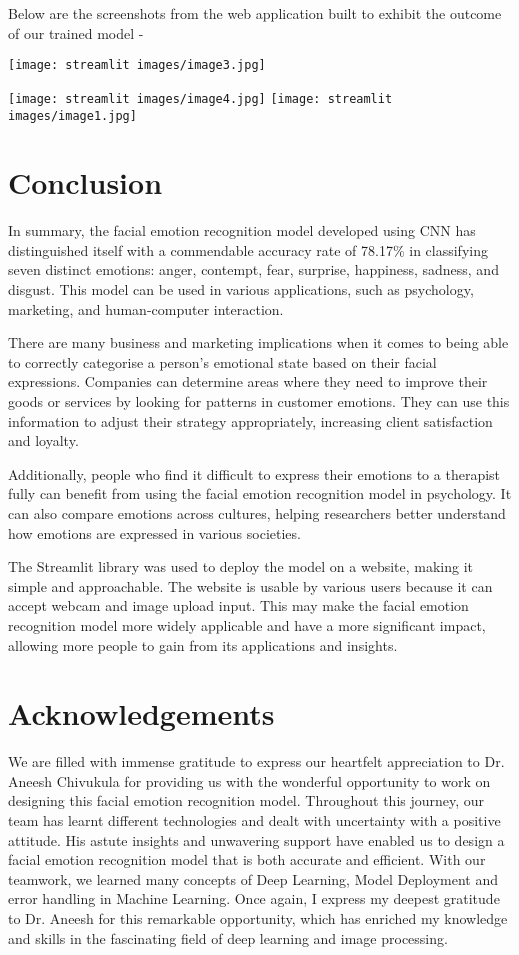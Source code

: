 \documentclass[11pt]{article}
\begin{document}
\noindent Below are the screenshots from the web application built to exhibit the outcome of our trained model -  
\begin{center}
    \texttt{[image: streamlit images/image3.jpg]}
\end{center}
\vspace{0.1in}
\begin{center}
    \texttt{[image: streamlit images/image4.jpg]}
    \texttt{[image: streamlit images/image1.jpg]}
\end{center}
\pagebreak
\section{Conclusion}
In summary, the facial emotion recognition model developed using CNN has distinguished itself with a commendable accuracy rate of 78.17\% in classifying seven distinct emotions: anger, contempt, fear, surprise, happiness, sadness, and disgust. This model can be used in various applications, such as psychology, marketing, and human-computer interaction.

There are many business and marketing implications when it comes to being able to correctly categorise a person's emotional state based on their facial expressions. Companies can determine areas where they need to improve their goods or services by looking for patterns in customer emotions. They can use this information to adjust their strategy appropriately, increasing client satisfaction and loyalty.

Additionally, people who find it difficult to express their emotions to a therapist fully can benefit from using the facial emotion recognition model in psychology. It can also compare emotions across cultures, helping researchers better understand how emotions are expressed in various societies.

The Streamlit library was used to deploy the model on a website, making it simple and approachable. The website is usable by various users because it can accept webcam and image upload input. This may make the facial emotion recognition model more widely applicable and have a more significant impact, allowing more people to gain from its applications and insights.

\section{Acknowledgements}
We are filled with immense gratitude to express our heartfelt appreciation to Dr. Aneesh Chivukula for providing us with the wonderful opportunity to work on designing this facial emotion recognition model. Throughout this journey, our team has learnt different technologies and dealt with uncertainty with a positive attitude. His astute insights and unwavering support have enabled us to design a facial emotion recognition model that is both accurate and efficient. With our teamwork, we learned many concepts of Deep Learning, Model Deployment and error handling in Machine Learning.  Once again, I express my deepest gratitude to Dr. Aneesh for this remarkable opportunity, which has enriched my knowledge and skills in the fascinating field of deep learning and image processing.

\printbibliography
\end{document}
